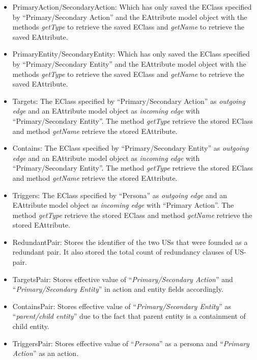 \begin{itemize}
	
	\item PrimaryAction/SecondaryAction: Which has only saved the EClass specified by \enquote{Primary/Secondary Action} and the EAttribute model object with the methods \textit{getType} to retrieve the saved EClass and \textit{getName} to retrieve the saved EAttribute.
	
	\item PrimaryEntity/SecondaryEntity: Which has only saved the EClass specified by \enquote{Primary/Secondary Entity} and the EAttribute model object with the methods \textit{getType} to retrieve the saved EClass and \textit{getName} to retrieve the saved EAttribute.
	
	\item Targets: The EClass specified by \enquote{Primary/Secondary Action} as \textit{outgoing edge} and an EAttribute model object as \textit{incoming edge} with \enquote{Primary/Secondary Entity}. The method \textit{getType} retrieve the stored EClass and method \textit{getName} retrieve the stored EAttribute.
	
	\item Contains: The EClass specified by \enquote{Primary/Secondary Entity} as \textit{outgoing edge} and an EAttribute model object as \textit{incoming edge} with \enquote{Primary/Secondary Entity}. The method \textit{getType} retrieve the stored EClass and method \textit{getName} retrieve the stored EAttribute.
	
	\item Triggers: The EClass specified by \enquote{Persona} as \textit{outgoing edge} and an EAttribute model object as \textit{incoming edge} with \enquote{Primary Action}. The method \textit{getType} retrieve the stored EClass and method \textit{getName} retrieve the stored EAttribute.
	
	\item RedundantPair: Stores the identifier of the two USs that were founded as a redundant pair. It also stored the total count of redundancy clauses of US-pair.
	
	\item TargetsPair: Stores effective value of \enquote{\textit{Primary/Secondary Action}} and \enquote{\textit{Primary/Secondary Entity}} in action and entity fields accordingly.
	
	\item ContainsPair: Stores effective value of \enquote{\textit{Primary/Secondary Entity}} as \enquote{\textit{parent/child entity}} due to the fact that parent entity is a containment of child entity.
	
	\item TriggersPair: Stores effective value of \enquote{\textit{Persona}} as a persona and \enquote{\textit{Primary Action}} as an action.
	
\end{itemize}
